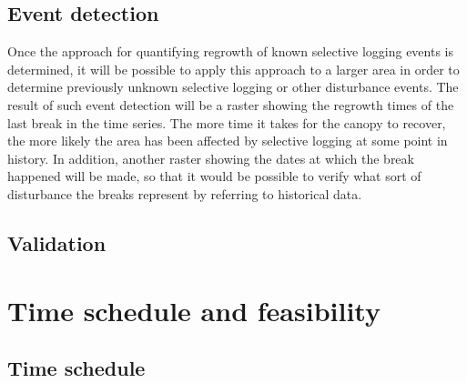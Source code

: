 \documentclass[a4paper,10pt]{article}
\begin{document}
\subsection{Event detection}

Once the approach for quantifying regrowth of known selective logging events is determined, it will be possible to apply this approach to a larger area in order to determine previously unknown selective logging or other disturbance events. The result of such event detection will be a raster showing the regrowth times of the last break in the time series. The more time it takes for the canopy to recover, the more likely the area has been affected by selective logging at some point in history. In addition, another raster showing the dates at which the break happened will be made, so that it would be possible to verify what sort of disturbance the breaks represent by referring to historical data.

\subsection{Validation}

\section{Time schedule and feasibility}

\subsection{Time schedule}
\end{document}
